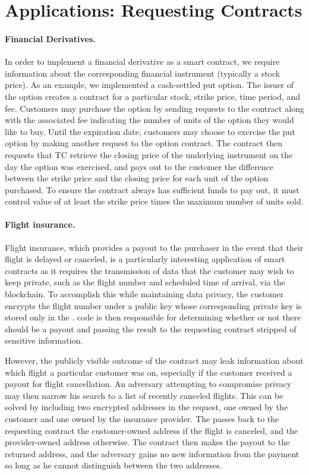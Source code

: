 \section{Applications: Requesting Contracts}

\paragraph{Financial Derivatives.}  In order to implement a financial derivative as a smart contract, we require information about the corresponding financial instrument (typically a stock price).  As an example, we implemented a cash-settled put option.  The issuer of the option creates a contract for a particular stock, strike price, time period, and fee.  Customers may purchase the option by sending requests to the contract along with the associated fee indicating the number of units of the option they would like to buy.  Until the expiration date, customers may choose to exercise the put option by making another request to the option contract.  The contract then requests that TC retrieve the closing price of the underlying instrument on the day the option was exercised, and pays out to the customer the difference between the strike price and the closing price for each unit of the option purchased.  To ensure the contract always has sufficient funds to pay out, it must control value of at least the strike price times the maximum number of units sold.

\paragraph{Flight insurance.} Flight insurance, which provides a payout to the purchaser in the event that their flight is delayed or canceled, is a particularly interesting application of smart contracts as it requires  the transmission of data that the customer may wish to keep private, such as the flight number and scheduled time of arrival, via the blockchain.  To accomplish this while maintaining data privacy, the customer encrypts the flight number under a public
key whose corresponding private key is stored only in the \encname.  \encname code is then responsible for determining whether or not there should be a payout and passing the result to the requesting contract stripped of sensitive information.

However, the publicly visible outcome of the contract may leak information about which flight a particular customer was on, especially if the customer received a payout for flight cancellation.  An adversary attempting to compromise privacy may then narrow his search to a list of recently canceled flights.  This can be solved by including two encrypted addresses in the request, one owned by the customer and one owned by the insurance provider.  The \encname passes back to the requesting contract the customer-owned address if the flight is canceled, and the provider-owned address otherwise.  The contract then makes the payout to the returned address, and the adversary gains no new information from the payment so long as he cannot distinguish between the two addresses.

